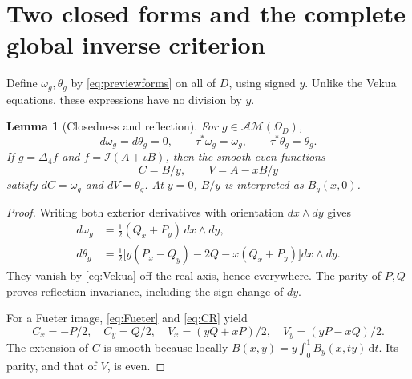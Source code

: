 \documentclass[11pt,a4paper]{article}
\numberwithin{equation}{section}
\newtheorem{lemma}[theorem]{Lemma}
\theoremstyle{definition}
\theoremstyle{remark}
\newcommand{\AM}{\mathcal{AM}}
\newcommand{\lap}{\Delta_4}
\newcommand{\cI}{\mathcal I}
\newcommand{\dd}{\,\mathrm d}
\begin{document}
\section{Two closed forms and the complete global inverse criterion}
\label{sec:periods}
Define $\omega_g,\theta_g$ by \eqref{eq:previewforms} on all of $D$,
using signed $y$. Unlike the Vekua equations, these expressions have no
division by $y$.

\begin{lemma}[Closedness and reflection]
\label{lem:closed}
For $g\in\AM(\Omega_D)$,
\[
 d\omega_g=d\theta_g=0,\qquad
 \tau^*\omega_g=\omega_g,\qquad\tau^*\theta_g=\theta_g.
\]
If $g=\lap f$ and $f=\cI(A+\iota B)$, then the smooth even functions
\begin{equation}
 C=B/y,\qquad V=A-xB/y
 \label{eq:CV}
\end{equation}
satisfy $dC=\omega_g$ and $dV=\theta_g$. At $y=0$, $B/y$ is interpreted
as $B_y(x,0)$.
\end{lemma}
\begin{proof}
Writing both exterior derivatives with orientation $dx\wedge dy$ gives
\begin{align*}
 d\omega_g&=\tfrac12(Q_x+P_y)\,dx\wedge dy,\\
 d\theta_g&=\tfrac12\big[y(P_x-Q_y)-2Q-x(Q_x+P_y)\big]dx\wedge dy.
\end{align*}
They vanish by \eqref{eq:Vekua} off the real axis, hence everywhere.
The parity of $P,Q$ proves reflection invariance, including the sign
change of $dy$.

For a Fueter image, \eqref{eq:Fueter} and \eqref{eq:CR} yield
\[
 C_x=-P/2,\quad C_y=Q/2,\quad
 V_x=(yQ+xP)/2,\quad V_y=(yP-xQ)/2.
\]
The extension of $C$ is smooth because locally
$B(x,y)=y\int_0^1 B_y(x,ty)\dd t$. Its parity, and that of $V$, is even.
\end{proof}
\end{document}
